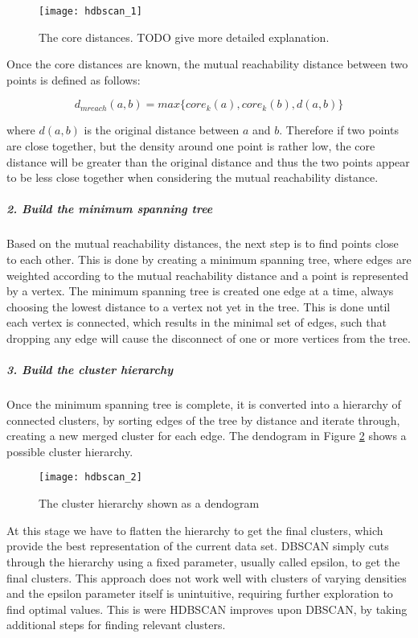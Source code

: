 \begin{figure}[h]
    \centering
    \texttt{[image: hdbscan\_1]}
    \caption{The core distances. TODO give more detailed explanation.}
    \label{fig:hdbscan_1}
\end{figure}

Once the core distances are known, the mutual reachability distance between two points is defined as follows:

\begin{equation*}
    d_{mreach}(a, b) = max\{core_k(a), core_k(b), d(a, b)\}
\end{equation*}

where $d(a, b)$ is the original distance between $a$ and $b$. Therefore if two points are close together, but the density around one point is rather low, the core distance will be greater than the original distance and thus the two points appear to be less close together when considering the mutual reachability distance.

\subparagraph{2. Build the minimum spanning tree}

Based on the mutual reachability distances, the next step is to find points close  to each other. This is done by creating a minimum spanning tree, where edges are weighted according to the mutual reachability distance and a point is represented by a vertex. The minimum spanning tree is created one edge at a time, always choosing the lowest distance to a vertex not yet in the tree. This is done until each vertex is connected, which results in the minimal set of edges, such that dropping any edge will cause the disconnect of one or more vertices from the tree.

\subparagraph{3. Build the cluster hierarchy}

Once the minimum spanning tree is complete, it is converted into a hierarchy of connected clusters, by sorting edges of the tree by distance and iterate through, creating a new merged cluster for each edge. The dendogram in Figure \ref{fig:hdbscan_2} shows a possible cluster hierarchy. %

\begin{figure}[h]
    \centering
    \texttt{[image: hdbscan\_2]}
    \caption{The cluster hierarchy shown as a dendogram}
    \label{fig:hdbscan_2}
\end{figure}

At this stage we have to flatten the hierarchy to get the final clusters, which provide the best representation of the current data set. DBSCAN simply cuts through the hierarchy using a fixed parameter, usually called epsilon, to get the final clusters. This approach does not work well with clusters of varying densities and the epsilon parameter itself is unintuitive, requiring further exploration to find optimal values. This is were HDBSCAN improves upon DBSCAN, by taking additional steps for finding relevant clusters.

